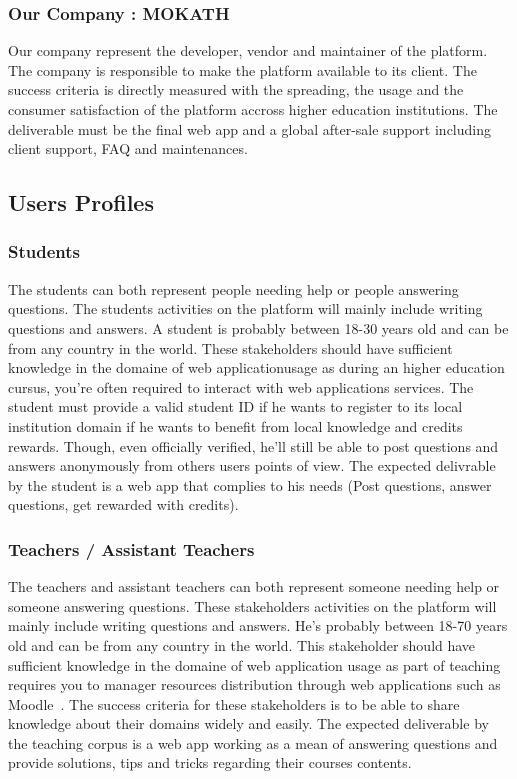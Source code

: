 \documentclass[12pt,a4paper,oneside, titlepage]{article}
\begin{document}
	    \subsubsection{Our Company : MOKATH}
	    Our company represent the developer, vendor and maintainer of the platform. The company is responsible to make the 
	    platform available to its client. The success criteria is directly measured with the spreading, the usage and the 
	    consumer satisfaction of the platform accross higher education institutions. The deliverable must be the final web
	    app and a global after-sale support including client support, FAQ and maintenances.
	    
	\subsection{Users Profiles}
		\subsubsection{Students}
	    The students can both represent people needing help or people answering questions. The students activities on the
	    platform will mainly include writing questions and answers. A student is probably between 18-30 years old and can 
	    be from any country in the world. These stakeholders should have sufficient knowledge in the domaine of web
	    applicationusage as during an higher education cursus, you're often required to interact with web applications 
	    services. The student must provide a valid student ID if he wants to register to its local institution domain if 
	    he wants to benefit from local knowledge and credits rewards. Though, even officially verified, he'll still be
	    able to post questions and answers anonymously from others users points of view. The expected delivrable by the 
	    student is a web app that complies to his needs (Post questions, answer questions, get rewarded with credits).  
	    
	    \subsubsection{Teachers / Assistant Teachers}
	    The teachers and assistant teachers can both represent someone needing help or someone answering questions. These
	    stakeholders activities on the platform will mainly include writing questions and answers. He's probably between 
	    18-70 years old and can be from any country in the world. This stakeholder should have sufficient knowledge in the 
	    domaine of web application usage as part of teaching requires you to manager resources distribution through web 
	    applications such as Moodle~\cite{moodleWebsite}. The success criteria for these stakeholders is to be able to 
	    share knowledge about their domains widely and easily. The expected deliverable by the teaching corpus is a web 
	    app working as a mean of answering questions and provide solutions, tips and tricks regarding their courses 
	    contents.
	    
\end{document}

